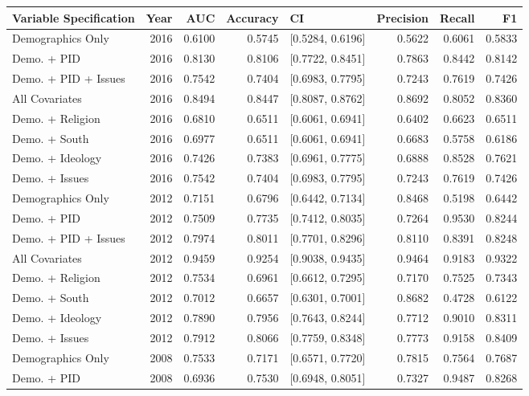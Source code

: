 \begin{longtable}{lrrrlrrr}
  \toprule
Variable Specification & Year & AUC & Accuracy & CI & Precision & Recall & F1 \\ 
  \midrule
Demographics Only & 2016 & 0.6100 & 0.5745 & [0.5284, 0.6196] & 0.5622 & 0.6061 & 0.5833 \\ 
  Demo. + PID & 2016 & 0.8130 & 0.8106 & [0.7722, 0.8451] & 0.7863 & 0.8442 & 0.8142 \\ 
  Demo. + PID + Issues & 2016 & 0.7542 & 0.7404 & [0.6983, 0.7795] & 0.7243 & 0.7619 & 0.7426 \\ 
  All Covariates & 2016 & 0.8494 & 0.8447 & [0.8087, 0.8762] & 0.8692 & 0.8052 & 0.8360 \\ 
  Demo. + Religion & 2016 & 0.6810 & 0.6511 & [0.6061, 0.6941] & 0.6402 & 0.6623 & 0.6511 \\ 
  Demo. + South & 2016 & 0.6977 & 0.6511 & [0.6061, 0.6941] & 0.6683 & 0.5758 & 0.6186 \\ 
  Demo. + Ideology & 2016 & 0.7426 & 0.7383 & [0.6961, 0.7775] & 0.6888 & 0.8528 & 0.7621 \\ 
  Demo. + Issues & 2016 & 0.7542 & 0.7404 & [0.6983, 0.7795] & 0.7243 & 0.7619 & 0.7426 \\ 
  Demographics Only & 2012 & 0.7151 & 0.6796 & [0.6442, 0.7134] & 0.8468 & 0.5198 & 0.6442 \\ 
  Demo. + PID & 2012 & 0.7509 & 0.7735 & [0.7412, 0.8035] & 0.7264 & 0.9530 & 0.8244 \\ 
  Demo. + PID + Issues & 2012 & 0.7974 & 0.8011 & [0.7701, 0.8296] & 0.8110 & 0.8391 & 0.8248 \\ 
  All Covariates & 2012 & 0.9459 & 0.9254 & [0.9038, 0.9435] & 0.9464 & 0.9183 & 0.9322 \\ 
  Demo. + Religion & 2012 & 0.7534 & 0.6961 & [0.6612, 0.7295] & 0.7170 & 0.7525 & 0.7343 \\ 
  Demo. + South & 2012 & 0.7012 & 0.6657 & [0.6301, 0.7001] & 0.8682 & 0.4728 & 0.6122 \\ 
  Demo. + Ideology & 2012 & 0.7890 & 0.7956 & [0.7643, 0.8244] & 0.7712 & 0.9010 & 0.8311 \\ 
  Demo. + Issues & 2012 & 0.7912 & 0.8066 & [0.7759, 0.8348] & 0.7773 & 0.9158 & 0.8409 \\ 
  Demographics Only & 2008 & 0.7533 & 0.7171 & [0.6571, 0.7720] & 0.7815 & 0.7564 & 0.7687 \\ 
  Demo. + PID & 2008 & 0.6936 & 0.7530 & [0.6948, 0.8051] & 0.7327 & 0.9487 & 0.8268 \\ 

\end{longtable}

